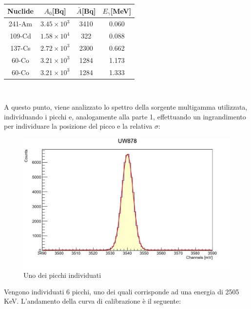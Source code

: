 \documentclass[a4paper,10pt]{article}
\begin{document}
\begin{center}
    \begin{tabular}{cccc}
        \toprule
        Nuclide & $A_{0}$[Bq] & $\bar{A}$[Bq] & $E_{\gamma}$[MeV]\\
        \midrule
         241-Am & $3.45 \times 10^3$ & 3410 & 0.060\\
	  109-Cd & $1.58 \times 10^4$ & 322 & 0.088\\
	  137-Cs & $2.72 \times 10^3$ & 2300 & 0.662\\
	  60-Co & $3.21 \times 10^3$ & 1284 & 1.173\\
	  60-Co & $3.21 \times 10^3$ & 1284 & 1.333\\
        \bottomrule
    \end{tabular}\\
\end{center}

\noindent A questo punto, viene analizzato lo spettro della sorgente multigamma utilizzata, individuando i picchi e, analogamente alla parte 1, effettuando un ingrandimento per individuare la posizione del picco e la relativa $\sigma$:

\begin{figure}[H]
    \centering
    \includegraphics[scale=0.6]{grafici/piccouw878}
    \caption{Uno dei picchi individuati}
\end{figure}

\noindent Vengono individuati 6 picchi, uno dei quali corrisponde ad una energia di 2505 KeV. L'andamento della curva di calibrazione \`e il seguente:
\end{document}
